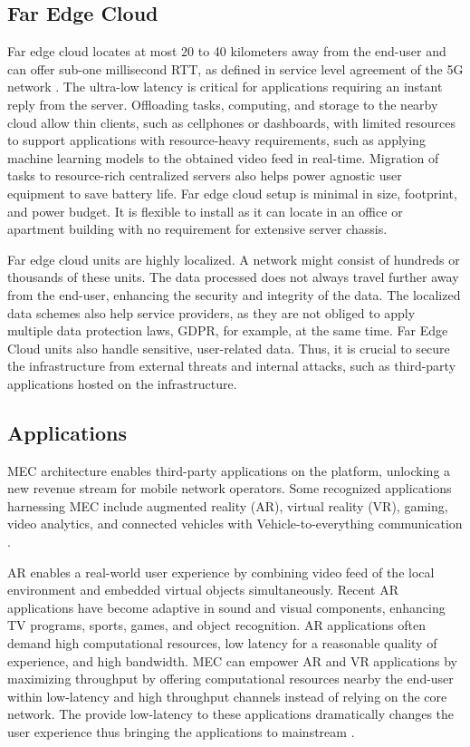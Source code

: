 \subsection{Far Edge Cloud}

Far edge cloud locates at most 20 to 40 kilometers away from the end-user and can offer sub-one millisecond RTT, as defined in service level agreement of the 5G network \cite{Parvez2018}. The ultra-low latency is critical for applications requiring an instant reply from the server. Offloading tasks, computing, and storage to the nearby cloud allow thin clients, such as cellphones or dashboards, with limited resources to support applications with resource-heavy requirements, such as applying machine learning models to the obtained video feed in real-time. Migration of tasks to resource-rich centralized servers also helps power agnostic user equipment to save battery life. Far edge cloud setup is minimal in size, footprint, and power budget. It is flexible to install as it can locate in an office or apartment building with no requirement for extensive server chassis. \cite{AirFrameOpenEdgeServer}

Far edge cloud units are highly localized. A network might consist of hundreds or thousands of these units. The data processed does not always travel further away from the end-user, enhancing the security and integrity of the data. The localized data schemes also help service providers, as they are not obliged to apply multiple data protection laws, GDPR, for example, at the same time. Far Edge Cloud units also handle sensitive, user-related data. Thus, it is crucial to secure the infrastructure from external threats and internal attacks, such as third-party applications hosted on the infrastructure.

\subsection{Applications}
\label{subs:applications}

MEC architecture enables third-party applications on the platform, unlocking a new revenue stream for mobile network operators. Some recognized applications harnessing MEC include augmented reality (AR), virtual reality (VR), gaming, video analytics, and connected vehicles with Vehicle-to-everything communication \cite{Sprecher2020}.

AR enables a real-world user experience by combining video feed of the local environment and embedded virtual objects simultaneously. Recent AR applications have become adaptive in sound and visual components, enhancing TV programs, sports, games, and object recognition. AR applications often demand high computational resources, low latency for a reasonable quality of experience, and high bandwidth. MEC can empower AR and VR applications by maximizing throughput by offering computational resources nearby the end-user within low-latency and high throughput channels instead of relying on the core network. The provide low-latency to these applications dramatically changes the user experience thus bringing the applications to mainstream \cite{Sprecher2020}. \cite{Abbas2018}

